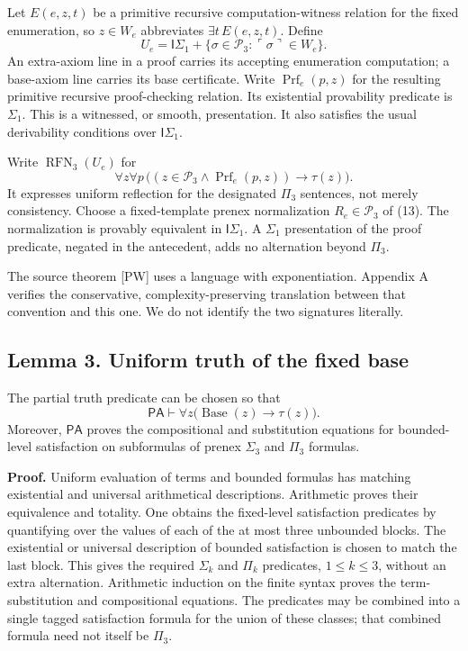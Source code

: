 \documentclass[
  11pt,
  letterpaper,
]{article}
\begin{document}
Let \(E(e,z,t)\) be a primitive recursive computation-witness relation
for the fixed enumeration, so \(z\in W_e\) abbreviates
\(\exists t\,E(e,z,t)\). Define \[
U_e=\mathsf I\Sigma_1+
\{\sigma\in\mathcal P_3:\ulcorner\sigma\urcorner\in W_e\}.
\tag{12}
\] An extra-axiom line in a proof carries its accepting enumeration
computation; a base-axiom line carries its base certificate. Write
\(\operatorname{Prf}_e(p,z)\) for the resulting primitive recursive
proof-checking relation. Its existential provability predicate is
\(\Sigma_1\). This is a witnessed, or smooth, presentation. It also
satisfies the usual derivability conditions over \(\mathsf I\Sigma_1\).

Write \(\operatorname{RFN}_3(U_e)\) for \[
\forall z\forall p\,
\bigl((z\in\mathcal P_3\wedge\operatorname{Prf}_e(p,z))
\rightarrow\tau(z)\bigr).
\tag{13}
\] It expresses uniform reflection for the designated \(\Pi_3\)
sentences, not merely consistency. Choose a fixed-template prenex
normalization \(R_e\in\mathcal P_3\) of (13). The normalization is
provably equivalent in \(\mathsf I\Sigma_1\). A \(\Sigma_1\)
presentation of the proof predicate, negated in the antecedent, adds no
alternation beyond \(\Pi_3\).

The source theorem {[}PW{]} uses a language with exponentiation.
Appendix A verifies the conservative, complexity-preserving translation
between that convention and this one. We do not identify the two
signatures literally.

\subsection{Lemma 3. Uniform truth of the fixed
base}\label{lemma-3.-uniform-truth-of-the-fixed-base}

The partial truth predicate can be chosen so that \[
\mathsf{PA}\vdash
\forall z\bigl(\operatorname{Base}(z)\rightarrow\tau(z)\bigr).
\tag{14}
\] Moreover, \(\mathsf{PA}\) proves the compositional and substitution
equations for bounded-level satisfaction on subformulas of prenex
\(\Sigma_3\) and \(\Pi_3\) formulas.

\textbf{Proof.} Uniform evaluation of terms and bounded formulas has
matching existential and universal arithmetical descriptions. Arithmetic
proves their equivalence and totality. One obtains the fixed-level
satisfaction predicates by quantifying over the values of each of the at
most three unbounded blocks. The existential or universal description of
bounded satisfaction is chosen to match the last block. This gives the
required \(\Sigma_k\) and \(\Pi_k\) predicates, \(1\leq k\leq3\),
without an extra alternation. Arithmetic induction on the finite syntax
proves the term-substitution and compositional equations. The predicates
may be combined into a single tagged satisfaction formula for the union
of these classes; that combined formula need not itself be \(\Pi_3\).
\end{document}
